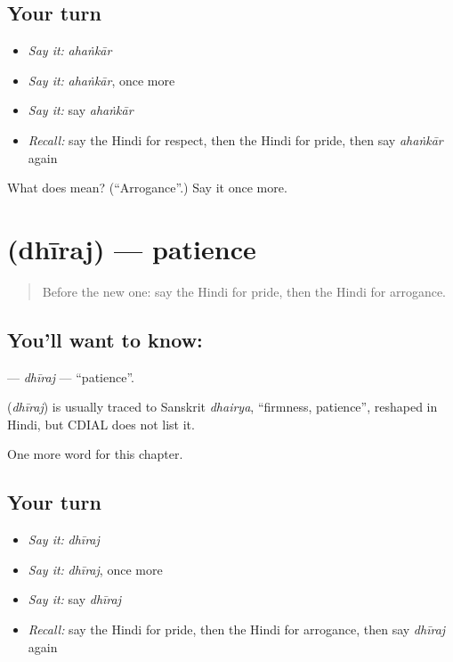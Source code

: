 \subsection*{Your turn}
\begin{itemize}
\raggedright
  \item \emph{Say it:} \emph{ahaṅkār}
  \item \emph{Say it:} \emph{ahaṅkār}, once more
  \item \emph{Say it:} say \emph{ahaṅkār}
  \item \emph{Recall:} say the Hindi for respect, then the Hindi for pride, then say \emph{ahaṅkār} again
\end{itemize}

\begin{tcolorbox}[breakable,colback=teal!4,colframe=teal!35!black,title={Before you move on}]
What does  mean? (\textquotedblleft{}Arrogance\textquotedblright{}.) Say it once more.
\end{tcolorbox}
\section[\texorpdfstring{\hi{धीरज} (dhīraj)}{धीरज (dhīraj)}]{ (dhīraj) — patience}

\label{lesson:HI-C258-dhiraj}



\begin{quote}
Before the new one: say the Hindi for pride, then the Hindi for arrogance.
\end{quote}

\subsection*{You'll want to know: }
\textbf{} — \emph{dhīraj} — \textquotedblleft{}patience\textquotedblright{}.

\begin{cousinweb}
\textbf{} (\emph{dhīraj}) is usually traced to Sanskrit \emph{dhairya}, \textquotedblleft{}firmness, patience\textquotedblright{}, reshaped in Hindi, but CDIAL does not list it.
\end{cousinweb}

\begin{grammarlens}[title={What you've built}]
One more word for this chapter.
\end{grammarlens}

\subsection*{Your turn}
\begin{itemize}
\raggedright
  \item \emph{Say it:} \emph{dhīraj}
  \item \emph{Say it:} \emph{dhīraj}, once more
  \item \emph{Say it:} say \emph{dhīraj}
  \item \emph{Recall:} say the Hindi for pride, then the Hindi for arrogance, then say \emph{dhīraj} again
\end{itemize}


